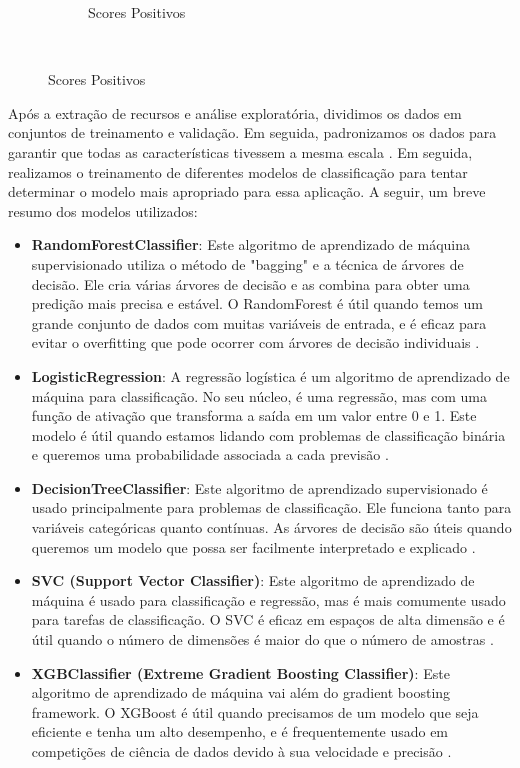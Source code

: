 \begin{figure}[htb]
\begin{subfigure}[b]{0.317\textwidth}
		\caption{Scores Positivos} \label{fig:leao}
	\end{subfigure} ~ %
	\fautor
\end{figure}

Após a extração de recursos e análise exploratória, dividimos os dados em conjuntos de treinamento e validação. Em seguida, padronizamos os dados para garantir que todas as características tivessem a mesma escala \cite{2000_Jain}. Em seguida, realizamos o treinamento de diferentes modelos de classificação para tentar determinar o modelo mais apropriado para essa aplicação. A seguir, um breve resumo dos modelos utilizados:

\begin{itemize}
	\item \textbf{RandomForestClassifier}: Este algoritmo de aprendizado de máquina supervisionado utiliza o método de "bagging" e a técnica de árvores de decisão. Ele cria várias árvores de decisão e as combina para obter uma predição mais precisa e estável. O RandomForest é útil quando temos um grande conjunto de dados com muitas variáveis de entrada, e é eficaz para evitar o overfitting que pode ocorrer com árvores de decisão individuais \cite[5-32]{2001_Breiman}.
	\item \textbf{LogisticRegression}: A regressão logística é um algoritmo de aprendizado de máquina para classificação. No seu núcleo, é uma regressão, mas com uma função de ativação que transforma a saída em um valor entre 0 e 1. Este modelo é útil quando estamos lidando com problemas de classificação binária e queremos uma probabilidade associada a cada previsão \cite[215-242]{1958_Cox}.
	\item \textbf{DecisionTreeClassifier}: Este algoritmo de aprendizado supervisionado é usado principalmente para problemas de classificação. Ele funciona tanto para variáveis categóricas quanto contínuas. As árvores de decisão são úteis quando queremos um modelo que possa ser facilmente interpretado e explicado \cite[81-106]{1986_Quinlan}.
	\item \textbf{SVC (Support Vector Classifier)}: Este algoritmo de aprendizado de máquina é usado para classificação e regressão, mas é mais comumente usado para tarefas de classificação. O SVC é eficaz em espaços de alta dimensão e é útil quando o número de dimensões é maior do que o número de amostras \cite[273-297]{1995_Cortes}.
	\item \textbf{XGBClassifier (Extreme Gradient Boosting Classifier)}: Este algoritmo de aprendizado de máquina vai além do gradient boosting framework. O XGBoost é útil quando precisamos de um modelo que seja eficiente e tenha um alto desempenho, e é frequentemente usado em competições de ciência de dados devido à sua velocidade e precisão \cite[785-794]{2016_Chen_IP}.
\end{itemize}

